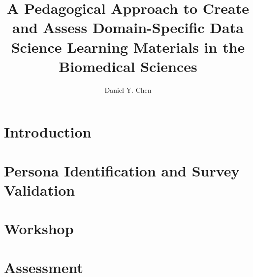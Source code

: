\documentclass[doublespace,draft,nopageskip]{VTthesis} %
\title{A Pedagogical Approach
       to Create and Assess
       Domain-Specific
       Data Science Learning Materials
       in the Biomedical Sciences}
\author{Daniel Y. Chen}
\begin{document}
  \frontmatter
  \maketitle
  \tableofcontents

	\listoffigures
	\listoftables
    \printnomenclature %

    

	\mainmatter

	\chapter{Introduction} \label{ch:introduction}
        

    \chapter{Persona Identification and Survey Validation} \label{ch:persona_validation}
        

    \chapter{Workshop} \label{ch:workshop}
        

    \chapter{Assessment} \label{ch:assessment}
        


	\appendix
\end{document}
